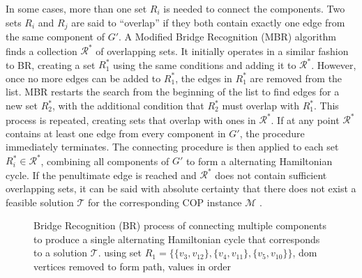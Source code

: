 \documentclass{elsarticle}
\begin{document}
In some cases, more than one set $R_i$ is needed to connect the components. Two sets $R_i$ and $R_j$ are said to ``overlap'' if they both contain exactly one edge from the same component of $G'$. A Modified Bridge Recognition (MBR) algorithm finds a collection $\mathcal{R}^*$ of overlapping sets. It initially operates in a similar fashion to BR, creating a set $R^{*}_1$ using the same conditions and adding it to $\mathcal{R}^*$. However, once no more edges can be added to $R^{*}_1$, the edges in $R^{*}_1$ are removed from the list. MBR restarts the search from the beginning of the list to find edges for a new set $R^{*}_2$, with the additional condition that $R^{*}_2$ must overlap with $R^{*}_1$. This process is repeated, creating sets that overlap with ones in $\mathcal{R}^*$. If at any point $\mathcal{R}^*$ contains at least one edge from every component in $G'$, the procedure immediately terminates. The connecting procedure is then applied to each set $R^{*}_i \in \mathcal{R}^*$, combining all components of $G'$ to form a alternating Hamiltonian cycle. If the penultimate edge is reached and $\mathcal{R}^*$ does not contain sufficient overlapping sets, it can be said with absolute certainty that there does not exist a feasible solution $\mathcal{T}$ for the corresponding COP instance $\mathcal{M}$ \cite{hawa2018}.

\begin{figure}[H]	
	\centering
	\begin{subfigure}[h]{0.23\textwidth}
		
		\label{fig:mpsconnect}
	\end{subfigure} \hspace{5mm} %
	\begin{subfigure}[h]{0.23\textwidth}
		
		\label{fig:mpscycle}
	\end{subfigure} \hspace{5mm}
	\begin{subfigure}[h]{0.23\textwidth}
		
		\label{fig:mpspath}
	\end{subfigure}
	\caption{Bridge Recognition (BR) process of connecting multiple components to produce a single alternating Hamiltonian cycle that corresponds to a solution $\mathcal{T}$. \alert{using set $R_1 = \{\{v_3, v_{12}\}, \{v_4, v_{11}\}, \{v_5, v_{10}\}\}$, dom vertices removed to form path, values in order}}
	\label{fig:br}
\end{figure}
\end{document}
